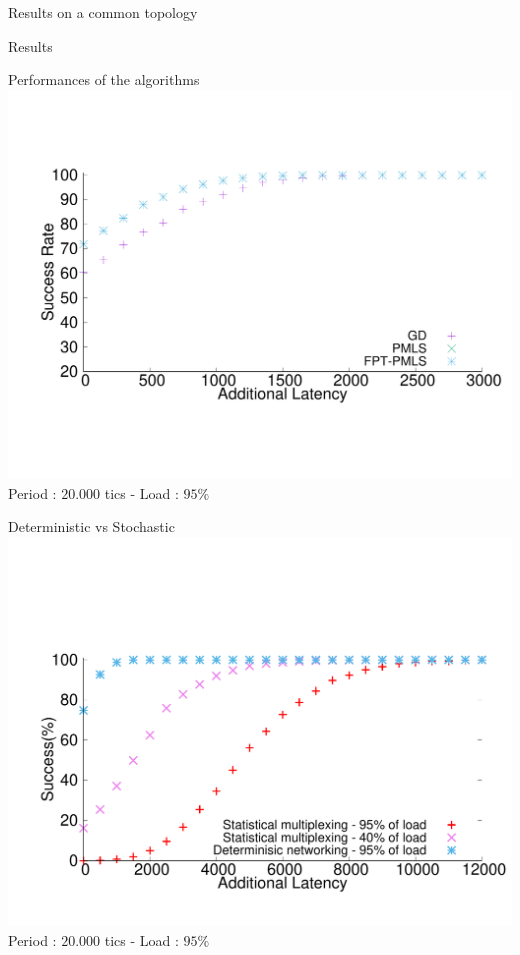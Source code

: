 \documentclass[10 pt]{beamer}
\begin{document}
\begin{section}{Results on a common topology}
\begin{subsection}{Results}
  \begin{frame}{Performances of the algorithms}
\centering
  \includegraphics[scale=0.4]{retour_21000.pdf}\\
  
    Period : $20.000$ tics -  Load : $95\%$
  \end{frame}
  
    \begin{frame}{Deterministic vs Stochastic}
\centering
\vspace{-2cm}
  \includegraphics[scale=0.4]{stochastic.pdf}\\
  
  Period : $20.000$ tics - Load : $95\%$
  \end{frame}
  
  

\end{subsection}


\end{section}
\end{document}
